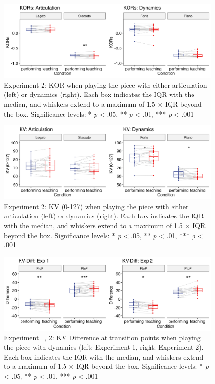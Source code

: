 \documentclass[
  english,
  man,floatsintext]{apa6}
\begin{document}
\begin{figure}
\includegraphics[width=1\linewidth]{manuscript_files/figure-latex/plot-kor-2-1} \caption{\label{fig:kor-2}Experiment 2: KOR when playing the piece with either articulation (left) or dynamics (right). Each box indicates the IQR with the median, and whiskers extend to a maximum of 1.5 × IQR beyond the box. Significance levels: * \textit{p} < .05, ** \textit{p} < .01, *** \textit{p} < .001}\label{fig:plot-kor-2}
\end{figure}

\begin{figure}
\includegraphics[width=1\linewidth]{manuscript_files/figure-latex/plot-vel-2-1} \caption{\label{fig:vel-2}Experiment 2: KV (0-127) when playing the piece with either articulation (left) or dynamics (right). Each box indicates the IQR with the median, and whiskers extend to a maximum of 1.5 × IQR beyond the box. Significance levels: * \textit{p} < .05, ** \textit{p} < .01, *** \textit{p} < .001}\label{fig:plot-vel-2}
\end{figure}

\begin{figure}
\includegraphics[width=1\linewidth]{manuscript_files/figure-latex/plot-vel-diff-1} \caption{\label{fig:vel-diff}Experiment 1, 2: KV Difference at transition points when playing the piece with dynamics (left: Experiment 1, right: Experiment 2). Each box indicates the IQR with the median, and whiskers extend to a maximum of 1.5 × IQR beyond the box. Significance levels: * \textit{p} < .05, ** \textit{p} < .01, *** \textit{p} < .001}\label{fig:plot-vel-diff}
\end{figure}
\end{document}

